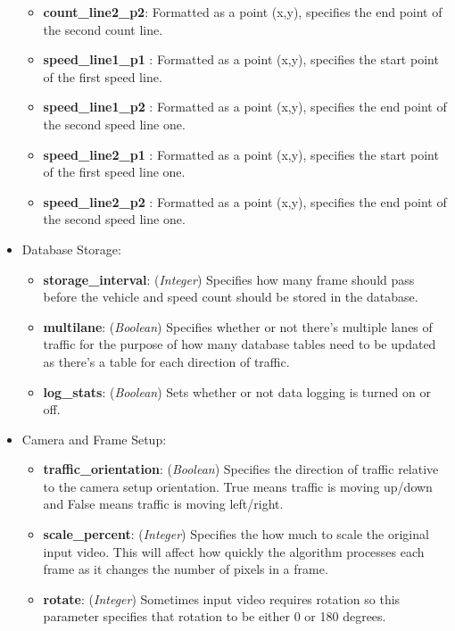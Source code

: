 \begin{itemize}
\begin{itemize}
        \item\textbf{count\_line2\_p2}: Formatted as a point (x,y), specifies the end point of the second count line.
        \item\textbf{speed\_line1\_p1 }: Formatted as a point (x,y), specifies the start point of the first speed line.
        \item\textbf{speed\_line1\_p2 }: Formatted as a point (x,y), specifies the end point of the second speed line one.
        \item\textbf{speed\_line2\_p1 }: Formatted as a point (x,y), specifies the start point of the first speed line one.
        \item\textbf{speed\_line2\_p2 }: Formatted as a point (x,y), specifies the end point of the second speed line one.
    \end{itemize}

\item Database Storage:
    \begin{itemize}
        \item\textbf{storage\_interval}: (\emph{Integer}) Specifies how many frame should pass before the vehicle and speed count should be stored in the database.
        \item\textbf{multilane}: (\emph{Boolean}) Specifies whether or not there's multiple lanes of traffic for the purpose of how many database tables need to be updated as there's a table for each direction of traffic. 
        \item \textbf{log\_stats}: (\emph{Boolean}) Sets whether or not data logging is turned on or off. 
    \end{itemize} 

\item Camera and Frame Setup:
    \begin{itemize}
        \item\textbf{traffic\_orientation}: (\emph{Boolean}) Specifies the direction of traffic relative to the camera setup orientation. True means traffic is moving up/down and False means traffic is moving left/right. 
        \item\textbf{scale\_percent}: (\emph{Integer}) Specifies the how much to scale the original input video. This will affect how quickly the algorithm processes each frame as it changes the number of pixels in a frame.
        \item\textbf{rotate}: (\emph{Integer}) Sometimes input video requires rotation so this parameter specifies that rotation to be either 0 or 180 degrees.
    \end{itemize} 


\end{itemize}
